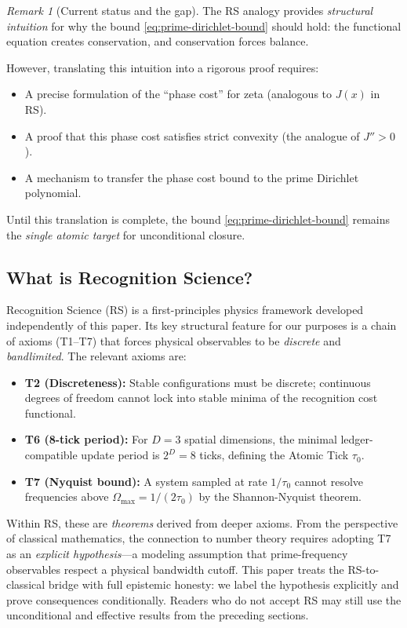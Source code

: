 \documentclass[11pt]{article}
\theoremstyle{definition}
\theoremstyle{remark}
\newtheorem{remark}[theorem]{Remark}
\theoremstyle{definition}
\begin{document}
\begin{remark}[Current status and the gap]\label{rem:rs-gap}
The RS analogy provides \emph{structural intuition} for why the bound \eqref{eq:prime-dirichlet-bound} should hold: the functional equation creates conservation, and conservation forces balance.

However, translating this intuition into a rigorous proof requires:
\begin{itemize}
\item A precise formulation of the ``phase cost'' for zeta (analogous to $J(x)$ in RS).
\item A proof that this phase cost satisfies strict convexity (the analogue of $J'' > 0$).
\item A mechanism to transfer the phase cost bound to the prime Dirichlet polynomial.
\end{itemize}

Until this translation is complete, the bound \eqref{eq:prime-dirichlet-bound} remains the \emph{single atomic target} for unconditional closure.
\end{remark}


\subsection*{What is Recognition Science?}

Recognition Science (RS) is a first-principles physics framework developed independently of this paper. Its key structural feature for our purposes is a chain of axioms (T1--T7) that forces physical observables to be \emph{discrete} and \emph{bandlimited}. The relevant axioms are:
\begin{itemize}
\item \textbf{T2 (Discreteness):} Stable configurations must be discrete; continuous degrees of freedom cannot lock into stable minima of the recognition cost functional.
\item \textbf{T6 (8-tick period):} For $D=3$ spatial dimensions, the minimal ledger-compatible update period is $2^D = 8$ ticks, defining the Atomic Tick $\tau_0$.
\item \textbf{T7 (Nyquist bound):} A system sampled at rate $1/\tau_0$ cannot resolve frequencies above $\Omega_{\max} = 1/(2\tau_0)$ by the Shannon-Nyquist theorem.
\end{itemize}
Within RS, these are \emph{theorems} derived from deeper axioms. From the perspective of classical mathematics, the connection to number theory requires adopting T7 as an \emph{explicit hypothesis}---a modeling assumption that prime-frequency observables respect a physical bandwidth cutoff. This paper treats the RS-to-classical bridge with full epistemic honesty: we label the hypothesis explicitly and prove consequences conditionally. Readers who do not accept RS may still use the unconditional and effective results from the preceding sections.
\end{document}
